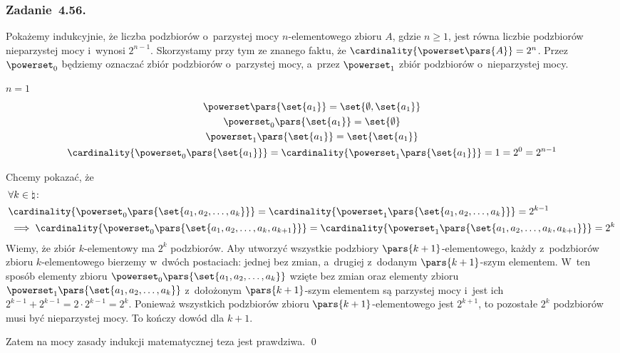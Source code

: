 \subsubsection*{Zadanie~4.56.}
Pokażemy indukcyjnie, że liczba podzbiorów o~parzystej mocy \(n\)-elementowego zbioru \(A\), gdzie \(n \geq 1\), jest równa liczbie podzbiorów nieparzystej mocy i~wynosi \(2^{n - 1}\). Skorzystamy przy tym ze znanego faktu, że \(\cardinality{\powerset\pars{A}} = 2^n\). Przez \(\powerset_0\) będziemy oznaczać zbiór podzbiorów o~parzystej mocy, a~przez \(\powerset_1\) zbiór podzbiorów o~nieparzystej mocy.
\begin{induction}
    \item \(n = 1\)
        \begin{gather*}
            \powerset\pars{\set{a_1}} = \set{\emptyset, \set{a_1}}\\
            \powerset_0\pars{\set{a_1}} = \set{\emptyset}\\
            \powerset_1\pars{\set{a_1}} = \set{\set{a_1}}\\
            \cardinality{\powerset_0\pars{\set{a_1}}} = \cardinality{\powerset_1\pars{\set{a_1}}} = 1 = 2^0 = 2^{n - 1}
        \end{gather*}
    \item Chcemy pokazać, że
        \begin{equation*}
            \begin{split}
                &\forall k \in \natural\colon\\
                &\cardinality{\powerset_0\pars{\set{a_1, a_2, \ldots, a_k}}} = \cardinality{\powerset_1\pars{\set{a_1, a_2, \ldots, a_k}}} = 2^{k - 1}\\ &\implies \cardinality{\powerset_0\pars{\set{a_1, a_2, \ldots, a_k, a_{k + 1}}}} = \cardinality{\powerset_1\pars{\set{a_1, a_2, \ldots, a_k, a_{k + 1}}}} = 2^k
            \end{split}
        \end{equation*}
        Wiemy, że zbiór \(k\)-elementowy ma \(2^k\) podzbiorów. Aby utworzyć wszystkie podzbiory \(\pars{k + 1}\)-elementowego, każdy z~podzbiorów zbioru \(k\)-elementowego bierzemy w~dwóch postaciach: jednej bez zmian, a~drugiej z~dodanym \(\pars{k + 1}\)-szym elementem. W~ten sposób elementy zbioru \(\powerset_0\pars{\set{a_1, a_2, \ldots, a_k}}\) wzięte bez zmian oraz elementy zbioru \(\powerset_1\pars{\set{a_1, a_2, \ldots, a_k}}\) z~dołożonym \(\pars{k + 1}\)-szym elementem są parzystej mocy i~jest ich \(2^{k - 1} + 2^{k - 1} = 2 \cdot 2^{k - 1} = 2^k\). Ponieważ wszystkich podzbiorów zbioru \(\pars{k + 1}\)-elementowego jest \(2^{k + 1}\), to pozostałe \(2^k\) podzbiorów musi być nieparzystej mocy. To kończy dowód dla \(k + 1\).
\end{induction}
Zatem na mocy zasady indukcji matematycznej teza jest prawdziwa.
\qed
